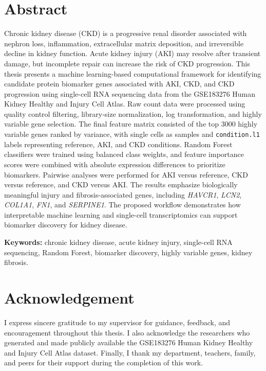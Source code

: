 \chapter*{Abstract}
Chronic kidney disease (CKD) is a progressive renal disorder associated with nephron loss, inflammation, extracellular matrix deposition, and irreversible decline in kidney function. Acute kidney injury (AKI) may resolve after transient damage, but incomplete repair can increase the risk of CKD progression. This thesis presents a machine learning-based computational framework for identifying candidate protein biomarker genes associated with AKI, CKD, and CKD progression using single-cell RNA sequencing data from the GSE183276 Human Kidney Healthy and Injury Cell Atlas. Raw count data were processed using quality control filtering, library-size normalization, log transformation, and highly variable gene selection. The final feature matrix consisted of the top 3000 highly variable genes ranked by variance, with single cells as samples and \texttt{condition.l1} labels representing reference, AKI, and CKD conditions. Random Forest classifiers were trained using balanced class weights, and feature importance scores were combined with absolute expression differences to prioritize biomarkers. Pairwise analyses were performed for AKI versus reference, CKD versus reference, and CKD versus AKI. The results emphasize biologically meaningful injury and fibrosis-associated genes, including \textit{HAVCR1}, \textit{LCN2}, \textit{COL1A1}, \textit{FN1}, and \textit{SERPINE1}. The proposed workflow demonstrates how interpretable machine learning and single-cell transcriptomics can support biomarker discovery for kidney disease.

\textbf{Keywords:} chronic kidney disease, acute kidney injury, single-cell RNA sequencing, Random Forest, biomarker discovery, highly variable genes, kidney fibrosis.
\clearpage

\chapter*{Acknowledgement}
I express sincere gratitude to my supervisor for guidance, feedback, and encouragement throughout this thesis. I also acknowledge the researchers who generated and made publicly available the GSE183276 Human Kidney Healthy and Injury Cell Atlas dataset. Finally, I thank my department, teachers, family, and peers for their support during the completion of this work.
\clearpage
